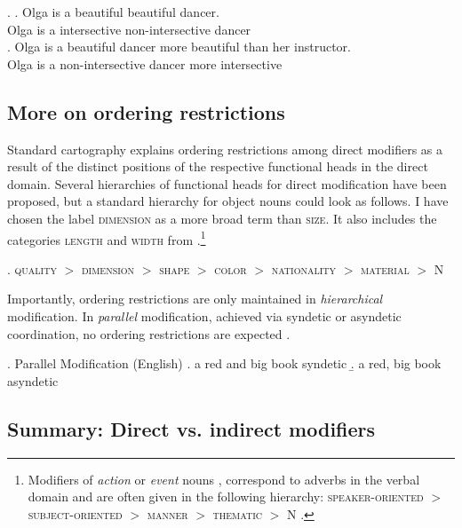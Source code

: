 \documentclass [output=book,colorlinks,citecolor=brown]{langscibook}
\begin{document}
\ex. \ag. Olga is a beautiful beautiful dancer.\\
Olga is a intersective non-intersective dancer\\
\null \hfill \citep[281]{larson:2004:indefinite}
\bg. Olga is a beautiful dancer more beautiful than her instructor.\\
Olga is a non-intersective dancer more intersective\\
\null \hfill \citep[19]{cinque:2010:adj}

\subsection{More on ordering restrictions} \label{AORs}

Standard cartography explains ordering restrictions among direct modifiers as a result of the distinct positions of the respective functional heads in the direct domain. Several hierarchies of functional heads for direct modification have been proposed, but a standard hierarchy for object nouns could look as follows. I have chosen the label \textsc{dimension} as a more broad term than \textsc{size}. It also includes the categories \textsc{length} and \textsc{width} from \citet[114]{scott:2002:stacked}.\footnote{Modifiers of \textit{action} or \textit{event} nouns \citep{grimshaw:1991:argument}, correspond to adverbs in the verbal domain \citep{cinque:1993:evidence, cinque:1999:adverbs, alexiadou:1997:adverb} and are often given in the following hierarchy: \textsc{speaker-oriented} $>$ \textsc{subject-oriented} $>$ \textsc{manner} $>$ \textsc{thematic} $>$ N \citep[324]{alex:2007:nounphrase}.} %

\ex. \textsc{quality} $>$ \textsc{dimension} $>$ \textsc{shape} $>$ \textsc{color} $>$ \textsc{nationality} $>$ \textsc{material} $>$ N \label{hierarchyjo}

Importantly, ordering restrictions are only maintained in \textit{hierarchical} modification. In \textit{parallel} modification, achieved via syndetic or asyndetic coordination, no ordering restrictions are expected \citep[578–580]{sproat:1991:the}.

\newpage

\ex. Parallel Modification (English)
\a. a red and big book \null \hfill syndetic
\b. a red, big book \null \hfill asyndetic

\subsection{Summary: Direct vs. indirect modifiers}
\end{document}
